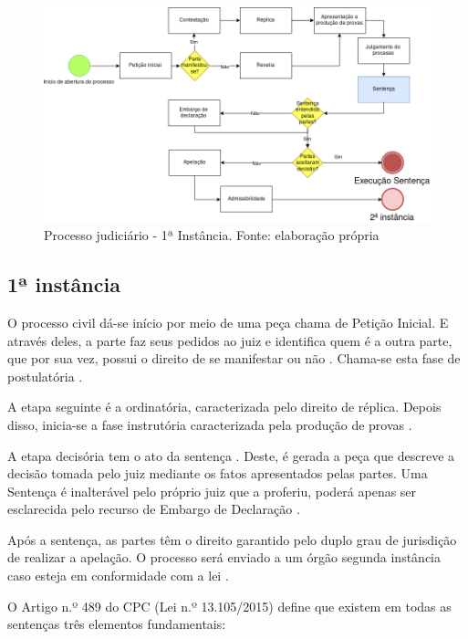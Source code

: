 \begin{figure}[ht]
	\centering
    \includegraphics[keepaspectratio=true,scale=0.4]{figuras/processoPrimeira}
	\caption[Processo judiciário - 1ª Instância]{Processo judiciário - 1ª Instância. Fonte: elaboração própria}
	\label{fig:processoPrimeira}
\end{figure}

\subsection{1ª instância}

O processo civil dá-se início por meio de uma peça chama de Petição Inicial. E através deles, a parte faz seus pedidos ao juiz e identifica quem é a outra parte, que por sua vez, possui o direito de se manifestar ou não \cite{brasil_lei_2015}. Chama-se esta fase de postulatória \cite{goncalves_direito_2016}.

A etapa seguinte é a ordinatória, caracterizada pelo direito de réplica. Depois disso, inicia-se a fase instrutória caracterizada pela produção de provas \cite{goncalves_direito_2016}.

A etapa decisória tem o ato da sentença \cite{goncalves_direito_2016}. Deste, é gerada a peça que descreve a decisão tomada pelo juiz mediante os fatos apresentados pelas partes. Uma Sentença é inalterável pelo próprio juiz que a proferiu, poderá apenas ser esclarecida pelo recurso de Embargo de Declaração \cite{brasil_lei_2015}.

Após a sentença, as partes têm o direito garantido pelo duplo grau de jurisdição de realizar a apelação. O processo será enviado a um órgão segunda instância caso esteja em conformidade com a lei \cite{goncalves_direito_2016}.

O Artigo n.º 489 do CPC (Lei n.º 13.105/2015) define que existem em todas as sentenças três elementos fundamentais:

